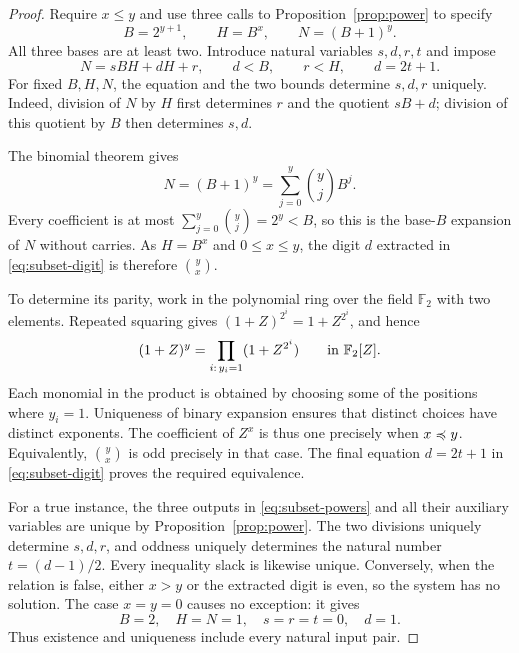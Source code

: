 \begin{proof}
Require $x\le y$ and use three calls to
Proposition~\ref{prop:power} to specify
\begin{equation}\label{eq:subset-powers}
 B=2^{y+1},\qquad H=B^x,\qquad N=(B+1)^y.
\end{equation}
All three bases are at least two.
Introduce natural variables $s,d,r,t$ and impose
\begin{equation}\label{eq:subset-digit}
 N=sBH+dH+r,\qquad d<B,\qquad r<H,\qquad d=2t+1.
\end{equation}
For fixed $B,H,N$, the equation and the two bounds determine
$s,d,r$ uniquely.  Indeed, division of $N$ by $H$ first determines
$r$ and the quotient $sB+d$; division of this quotient by $B$ then
determines $s,d$.

The binomial theorem gives
\[
 N=(B+1)^y=\sum_{j=0}^{y}\binom yj B^j.
\]
Every coefficient is at most $\sum_{j=0}^{y}\binom yj=2^y<B$,
so this is the base-$B$ expansion of $N$ without carries.
As $H=B^x$ and $0\le x\le y$, the digit $d$ extracted in
\eqref{eq:subset-digit} is therefore $\binom yx$.

To determine its parity, work in the polynomial ring over the field
$\mathbb F_2$ with two elements.  Repeated squaring gives
$(1+Z)^{2^i}=1+Z^{2^i}$, and hence
\[
 (1+Z)^y=\prod_{i:\,y_i=1}(1+Z^{2^i})
 \qquad\hbox{in }\mathbb F_2[Z].
\]
Each monomial in the product is obtained by choosing some of the
positions where $y_i=1$.  Uniqueness of binary expansion ensures
that distinct choices have distinct exponents.  The coefficient of
$Z^x$ is thus one precisely when $x\preccurlyeq y$.
Equivalently, $\binom yx$ is odd precisely in that case.
The final equation $d=2t+1$ in \eqref{eq:subset-digit} proves the
required equivalence.

For a true instance, the three outputs in
\eqref{eq:subset-powers} and all their auxiliary variables are
unique by Proposition~\ref{prop:power}.  The two divisions uniquely
determine $s,d,r$, and oddness uniquely determines the natural number
$t=(d-1)/2$.  Every inequality slack is likewise unique.
Conversely, when the relation is false, either $x>y$ or the extracted
digit is even, so the system has no solution.
The case $x=y=0$ causes no exception: it gives
\[
 B=2,\quad H=N=1,\quad s=r=t=0,\quad d=1.
\]
Thus existence and uniqueness include every natural input pair.
\end{proof}
